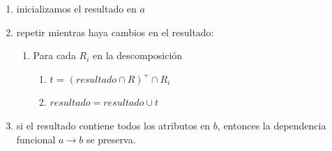 \documentclass[twoside]{article}
\begin{document}
\begin{enumerate}
            \begin{enumerate}
                  \item inicializamos el resultado en $a$
                  \item repetir mientras haya cambios en el resultado:
                        \begin{enumerate}
                              \item Para cada $R_i$ en la descomposición
                                    \begin{enumerate}
                                          \item $t$ = $(resultado \cap R)^+ \cap R_i$
                                          \item $resultado = resultado \cup t$
                                    \end{enumerate}
                        \end{enumerate}
                  \item si el resultado contiene todos los atributos en $b$, entonces la dependencia funcional $a \rightarrow b$ se preserva.


\end{enumerate}
\end{enumerate}
\end{document}
